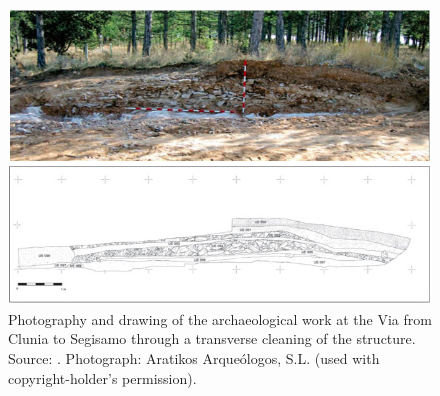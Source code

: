 		\begin{figure}[!htb]
			\includegraphics[width=.9\linewidth]{figures/verdu_Fig3}
			\centering
			\caption{Photography and drawing of the archaeological work at the Via from Clunia to Segisamo through a transverse cleaning of the structure. Source: \textcite[56]{Palomino_2010}. Photograph: Aratikos Arqueólogos, S.L. (used with copyright-holder’s permission).}
			\label{fig:verdu_Fig3}
		\end{figure}
		
